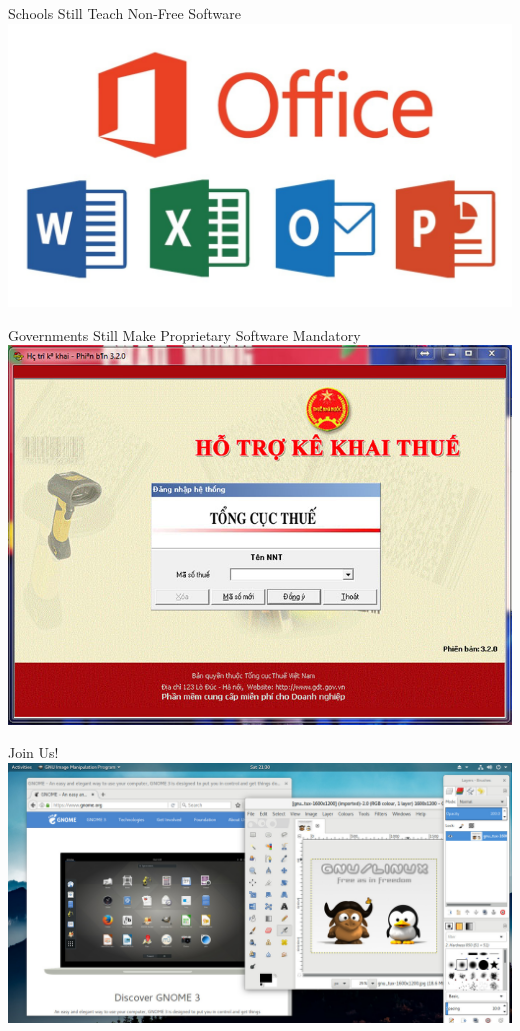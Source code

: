 \documentclass[pdf]{beamer}
\begin{document}
\begin{frame}{Schools Still Teach Non-Free Software}
  \includegraphics[width=\textwidth]{ms-office.jpg}
\end{frame}

\begin{frame}{Governments Still Make Proprietary Software Mandatory}
  \includegraphics[width=\textwidth]{htkk-2014.jpg}
\end{frame}

\begin{frame}{Join Us!}
  \includegraphics[width=\textwidth]{pureos8-gnome3.jpg}
\end{frame}
\end{document}
